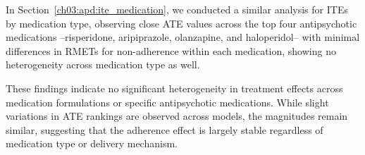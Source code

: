 In Section~\ref{ch03:apd:ite_medication}, we conducted a similar analysis for ITEs by medication type, observing close ATE values across the top four antipsychotic medications --risperidone, aripiprazole, olanzapine, and haloperidol-- with minimal differences in RMETs for non-adherence within each medication, showing no heterogeneity across medication type as well.

These findings indicate no significant heterogeneity in treatment effects across medication formulations or specific antipsychotic medications.
While slight variations in ATE rankings are observed across models, the magnitudes remain similar, suggesting that the adherence effect is largely stable regardless of medication type or delivery mechanism.

